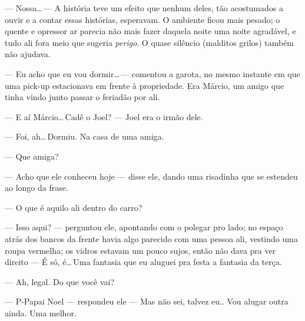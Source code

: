 --- Nossa\ldots\,--- A história teve um efeito que nenhum deles, tão acostumados a ouvir e a contar essas histórias, esperavam. O ambiente ficou mais pesado; o quente e opressor ar parecia não mais fazer daquela noite uma noite agradável, e tudo ali fora meio que sugeria \emph{perigo}. O quase silêncio (malditos grilos) também não ajudava.

--- Eu acho que eu vou dormir\ldots\,--- comentou a garota, no mesmo instante em que uma pick-up estacionava em frente à propriedade. Era Márcio, um amigo que tinha vindo junto passar o feriadão por ali.

--- E aí Márcio\ldots\,Cadê o Joel? --- Joel era o irmão dele.

--- Foi, ah\ldots\,Dormiu. Na casa de uma amiga.

--- Que amiga?

--- Acho que ele conheceu hoje --- disse ele, dando uma risadinha que se estendeu ao longo da frase.

--- O que é aquilo ali dentro do carro?

--- Isso aqui? --- perguntou ele, apontando com o polegar pro lado; no espaço atrás dos bancos da frente havia algo parecido com uma pessoa ali, vestindo uma roupa vermelha; os vidros estavam um pouco sujos, então não dava pra ver direito --- É só, é\ldots\,Uma fantasia que eu aluguei pra festa a fantasia da terça.

--- Ah, legal. Do que você vai?

--- P-Papai Noel --- respondeu ele --- Mas não sei, talvez eu.. Vou alugar outra ainda. Uma melhor.
